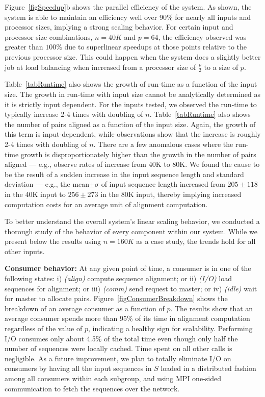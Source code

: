 \documentclass[10pt,journal,letterpaper,compsoc]{IEEEtran}
\begin{document}
Figure~\ref{figSpeedup}b shows the parallel efficiency of the system. As shown, the system is able to maintain an efficiency well over 90\% for nearly all inputs and processor sizes, implying a strong scaling behavior. For certain input and processor size combinations, $n=40K$ and $p=64$, the efficiency observed was greater than $100\%$ due to superlinear speedups at those points relative to the previous processor size. This could happen when the system does a slightly better job at load balancing when increased from a processor size of $\frac{p}{2}$ to a size of $p$.

Table~\ref{tabRuntime} also shows the growth of run-time as a function of the input size. The growth in run-time with input size cannot be analytically determined as it is strictly input dependent. For the inputs tested, we observed the run-time to typically increase 2-4 times with doubling of $n$. Table~\ref{tabRuntime} also shows the number of pairs aligned as a function of the input size. Again, the growth of this term is input-dependent, while observations show that the increase is roughly 2-4 times with doubling of $n$. There are a few anomalous cases where the run-time growth is disproportionately higher than the growth in the number of pairs aligned --- e.g., observe rates of increase from 40K to 80K. We found the cause to be the result of a sudden increase in the input sequence length and standard deviation --- e.g., the mean$\pm\sigma$ of input sequence length increased from $205\pm 118$ in the 40K input to $256\pm 273$ in the 80K input, thereby implying increased computation costs for an average unit of alignment computation.



To better understand the overall system's linear scaling behavior, we conducted a thorough study of the behavior of every component within our system. While we present below the results using $n=160K$ as a case study, the trends hold for all other inputs.



{\bf Consumer behavior: } At any given point of time, a consumer is in one of the following states: i) \emph{(align)} compute sequence alignment; or ii) \emph{(I/O)} load sequences for alignment; or iii) \emph{(comm)} send request to master; or iv) \emph{(idle)} wait for master to allocate pairs. Figure~\ref{figConsumerBreakdown} shows the breakdown of an average consumer as a function of $p$. The results show that an average consumer spends more than 95\% of its time in alignment computation regardless of the value of $p$, indicating a healthy sign for scalability. Performing I/O consumes only about 4.5\% of the total time even though only half the number of sequences were locally cached. Time spent on all other calls is negligible. As a future improvement, we plan to totally eliminate I/O on consumers by having all the input sequences in $S$ loaded in a distributed fashion among all consumers within each subgroup, and using MPI one-sided communication to fetch the sequences over the network.
\end{document}
